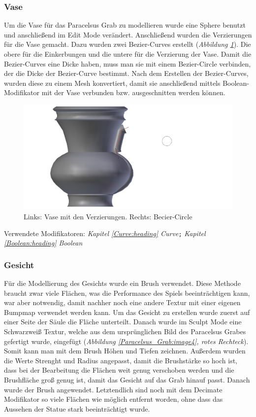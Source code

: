 \subsubsection{Vase}
Um die Vase für das Paracelsus Grab zu modellieren wurde eine Sphere benutzt und anschließend im Edit Mode verändert. Anschließend wurden die Verzierungen für die Vase gemacht.
Dazu wurden zwei Bezier-Curves erstellt (\textit{Abbildung \ref{Paracelsus_Grab:image5}}). Die obere für die Einkerbungen und die untere für die Verzierung der Vase. Damit die Bezier-Curves eine
Dicke haben, muss man sie mit einem Bezier-Circle verbinden, der die Dicke der Bezier-Curve bestimmt.
Nach dem Erstellen der Bezier-Curves, wurden diese zu einem Mesh konvertiert, damit sie anschließend mittels Boolean-Modifikator mit der Vase verbunden
bzw. ausgeschnitten werden können.

\begin{figure}[H]
    \centering
    \includegraphics[width=.8\textwidth]{images/Paracelsus-Grab_Vase-Curve.png}
    \caption{Links: Vase mit den Verzierungen. Rechts: Becier-Circle}
    \label{Paracelsus_Grab:image5}
\end{figure}

Verwendete Modifikatoren: \textit{Kapitel \ref{Curve:heading} \dq Curve\dq}\verb+;+ \textit{Kapitel \ref{Boolean:heading} \dq Boolean\dq}

\subsubsection{Gesicht}
Für die Modellierung des Gesichts wurde ein Brush verwendet. Diese Methode braucht zwar viele Flächen, was die Performance des Spiels beeinträchtigen kann, war
aber notwendig, damit nachher noch eine andere Textur mit einer eigenen Bumpmap verwendet werden kann. Um das Gesicht zu erstellen wurde zuerst auf einer Seite der Säule
die Fläche unterteilt. Danach wurde im Sculpt Mode eine Schwarzweiß Textur, welche aus dem ursprünglichen Bild des Paracelsus Grabes gefertigt wurde,
eingefügt (\textit{Abbildung \ref{Paracelsus_Grab:image4}, rotes Rechteck}).
Somit kann man mit dem Brush Höhen und Tiefen zeichnen. Außerdem wurden die Werte Strenght und Radius angepasst, damit die Brushstärke so hoch ist, dass bei der Bearbeitung die Flächen weit genug verschoben werden
und die Brushfläche groß genug ist, damit das Gesicht auf das Grab hinauf passt. Danach wurde der Brush angewendet. Letztendlich sind noch mit dem Decimate Modifikator so viele Flächen wie
möglich entfernt worden, ohne dass das Aussehen der Statue stark beeinträchtigt wurde.

